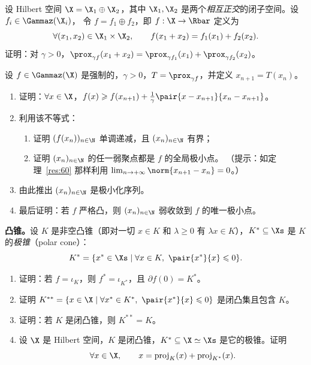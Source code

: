 
\begin{exercise}[原讲义 B.4 练习 25]
\label{exo:B4-25}
设 Hilbert 空间 $\X=\X_1\oplus\X_2$，其中 $\X_1,\X_2$ 是两个\emph{相互正交}的闭子空间。设 $f_i\in\Gammaz(\X_i)$，
令 $f=f_1\oplus f_2$，即 $f:\X\to\Rbar$ 定义为
\[
  \forall (x_1,x_2)\in\X_1\times\X_2,\qquad f(x_1+x_2)=f_1(x_1)+f_2(x_2).
\]
证明：对 $\gamma>0$，$\prox_{\gamma f}(x_1+x_2)=\prox_{\gamma f_1}(x_1)+\prox_{\gamma f_2}(x_2)$。
\end{exercise}

\begin{exercise}[原讲义 B.4 练习 26]
\label{exo:B4-26}
设 $f\in\Gammaz(\X)$ 是强制的，$\gamma>0$，$T=\prox_{\gamma f}$，并定义 $x_{n+1}=T(x_n)$。
\begin{enumerate}[label=\arabic*.]
  \item 证明：$\forall x\in\X$，$f(x)\geqslant f(x_{n+1})+\frac1\gamma\pair{x-x_{n+1}}{x_n-x_{n+1}}$。
  \item 利用该不等式：
  \begin{enumerate}[label=(\roman*)]
    \item 证明 $(f(x_n))_{n\in\N}$ 单调递减，且 $(x_n)_{n\in\N}$ 有界；
    \item 证明 $(x_n)_{n\in\N}$ 的任一弱聚点都是 $f$ 的全局极小点。
    （提示：如定理~\ref{res:60} 那样利用 $\lim_{n\to+\infty}\norm{x_{n+1}-x_n}=0$。）
  \end{enumerate}
  \item 由此推出 $(x_n)_{n\in\N}$ 是极小化序列。
  \item 最后证明：若 $f$ 严格凸，则 $(x_n)_{n\in\N}$ 弱收敛到 $f$ 的唯一极小点。
\end{enumerate}
\end{exercise}

\begin{exercise}[原讲义 B.5 练习 27]
\label{exo:B5-27}
\textbf{凸锥。}设 $K$ 是非空凸锥（即对一切 $x\in K$ 和 $\lambda\geqslant0$ 有 $\lambda x\in K$），$K^*\subseteq\Xs$ 是 $K$ 的\emph{极锥}（polar cone）：
\[
  K^*=\{x^*\in\Xs\mid\forall x\in K,\ \pair{x^*}{x}\leqslant0\}.
\]
\begin{enumerate}[label=\arabic*.]
  \item 证明：若 $f=\iota_K$，则 $f^*=\iota_{K^*}$，且 $\partial f(0)=K^*$。
  \item 证明 $K^{**}=\{x\in\X\mid\forall x^*\in K^*,\ \pair{x^*}{x}\leqslant0\}$ 是闭凸集且包含 $K$。
  \item 证明：若 $K$ 是闭凸锥，则 $K^{**}=K$。
  \item 设 $\X$ 是 Hilbert 空间，$K$ 是闭凸锥，$K^*\subseteq\X\simeq\Xs$ 是它的极锥。证明
  \[
    \forall x\in\X,\qquad x=\operatorname{proj}_K(x)+\operatorname{proj}_{K^*}(x).
  \]
\end{enumerate}
\end{exercise}

